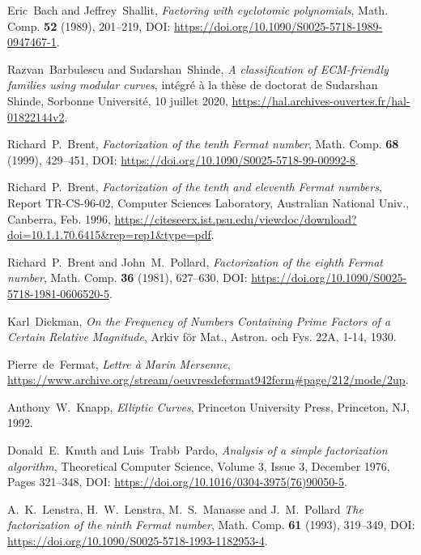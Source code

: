 \documentclass[a4paper, 11pt, pdftex]{report}
\theoremstyle{plain}
\theoremstyle{definition}
\begin{document}
\begin{thebibliography}{99}

 Eric~Bach and Jeffrey~Shallit, \emph{Factoring with cyclotomic polynomials},
Math. Comp. \textbf{52} (1989), 201--219, DOI: \url{https://doi.org/10.1090/S0025-5718-1989-0947467-1}.

 Razvan~Barbulescu and Sudarshan~Shinde, \emph{A classification
of ECM-friendly families using modular curves}, intégré à la thèse de doctorat de Sudarshan Shinde,
Sorbonne Université, 10 juillet 2020, \url{https://hal.archives-ouvertes.fr/hal-01822144v2}.

 Richard~P.~Brent, \emph{Factorization of the tenth Fermat number}, Math. Comp.
\textbf{68} (1999), 429--451, DOI: \url{https://doi.org/10.1090/S0025-5718-99-00992-8}.

 Richard~P.~Brent, \emph{Factorization of the tenth and eleventh Fermat numbers},
Report TR-CS-96-02, Computer Sciences Laboratory, Australian National Univ., Canberra, Feb. 1996,
\url{https://citeseerx.ist.psu.edu/viewdoc/download?doi=10.1.1.70.6415&rep=rep1&type=pdf}.

 Richard~P.~Brent and John~M.~Pollard, \emph{Factorization of the eighth
Fermat number}, Math. Comp. \textbf{36} (1981), 627--630, DOI:
\url{https://doi.org/10.1090/S0025-5718-1981-0606520-5}.

 Karl~Dickman, \emph{On the Frequency of Numbers Containing Prime Factors
of a Certain Relative Magnitude}, Arkiv för Mat., Astron. och Fys. 22A, 1-14, 1930. 

 Pierre~de~Fermat, \emph{Lettre à Marin Mersenne},
\url{https://www.archive.org/stream/oeuvresdefermat942ferm#page/212/mode/2up}.

 Anthony~W.~Knapp, \emph{Elliptic Curves}, Princeton University Press,
Princeton, NJ, 1992.

 Donald~E.~Knuth and Luis~Trabb~Pardo, \emph{Analysis of a simple
factorization algorithm}, Theoretical Computer Science, Volume 3, Issue 3, December 1976,
Pages 321--348, DOI: \url{https://doi.org/10.1016/0304-3975(76)90050-5}.

 A.~K.~Lenstra, H.~W.~Lenstra, M.~S.~Manasse and J.~M.~Pollard
\emph{The factorization of the ninth Fermat number}, Math. Comp. \textbf{61} (1993), 319--349,
DOI: \url{https://doi.org/10.1090/S0025-5718-1993-1182953-4}.


\end{thebibliography}
\end{document}
